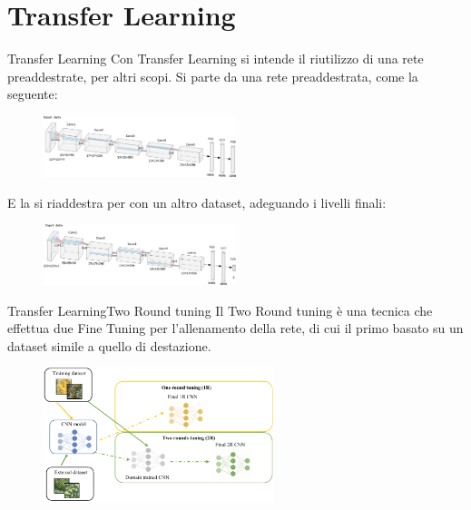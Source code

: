 \documentclass[aspectratio=169]{beamer}
\begin{document}
\section{Transfer Learning}
\begin{frame}{Transfer Learning}
    Con Transfer Learning si intende il riutilizzo di una rete preaddestrate, per altri scopi. Si parte da una rete preaddestrata, come la seguente:
    \begin{figure}[ht]
        \centering
        \includegraphics[width=0.5\textwidth]{addestramento-rete-neurale/alexnet.pdf}
    \end{figure}
    E la si riaddestra per con un altro  dataset, adeguando i livelli finali:
    \begin{figure}[ht]
        \centering
        \includegraphics[width=0.5\textwidth]{addestramento-rete-neurale/alexnet-tl.pdf}
    \end{figure}
\end{frame}

\begin{frame}{Transfer Learning}{Two Round tuning}
    Il Two Round tuning è una tecnica che effettua due Fine Tuning per l'allenamento della rete, di cui il primo basato su un dataset simile a quello di destazione.
    \begin{figure}[ht]
        \centering
        \includegraphics[width=0.6\textwidth]{transfer-learning/tl_2rt.pdf}
    \end{figure}
\end{frame}
\end{document}
